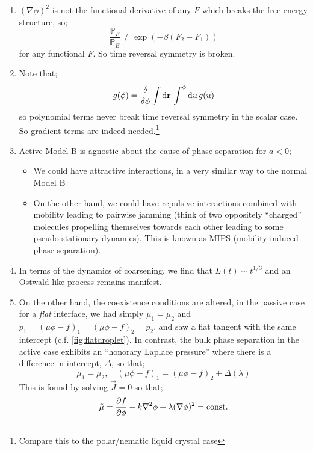\begin{enumerate}
\item $(\nabla \phi)^2$ is not the functional derivative of any $F$ which breaks the free energy structure, so;
\begin{equation*}
\frac{\mathbb{P}_F}{\mathbb{P}_B} \neq \exp\left(-\beta(F_2 - F_1)\right)
\end{equation*}
for any functional $F$. So time reversal symmetry is broken.
\item Note that;
\begin{equation*}
g(\phi) = \frac{\delta}{\delta \phi}\int{\text{d}\mathbf{r} \,\int^{\phi}{\text{d}u \,g(u)}}
\end{equation*}
so polynomial terms never break time reversal symmetry in the scalar case. So gradient terms are indeed needed.\footnote{Compare this to the polar/nematic liquid crystal case}
\item Active Model B is agnostic about the cause of phase separation for $a < 0$;
\begin{itemize}
\item We could have attractive interactions, in a very similar way to the normal Model B
\item On the other hand, we could have repulsive interactions combined with mobility leading to pairwise jamming (think of two oppositely ``charged'' molecules propelling themselves towards each other leading to some pseudo-stationary dynamics). This is known as MIPS (mobility induced phase separation). 
\end{itemize}
\item In terms of the dynamics of coarsening, we find that $L(t) \sim t^{1/3}$ and an Ostwald-like process remains manifest.
\item On the other hand, the coexistence conditions are altered, in the passive case for a \emph{flat} interface, we had simply $\mu_1 = \mu_2$ and $p_1 = (\mu \phi - f)_1 = (\mu \phi - f)_2 = p_2$, and saw a flat tangent with the same intercept (c.f. \autoref{fig:flatdroplet}). In contrast, the bulk phase separation in the active case exhibits an ``honorary Laplace pressure'' where there is a difference in intercept, $\Delta$, so that;
\begin{equation*}
\mu_1 = \mu_2, \quad (\mu \phi - f)_1 = (\mu \phi - f)_2 + \Delta(\lambda)
\end{equation*}
This is found by solving $\vec{J} = 0$ so that;
\begin{equation*}
\tilde{\mu} = \frac{\del f}{\del \phi} - k \nabla^2 \phi + \lambda (\nabla \phi)^2 = \text{const.}

\end{equation*}
\end{enumerate}
